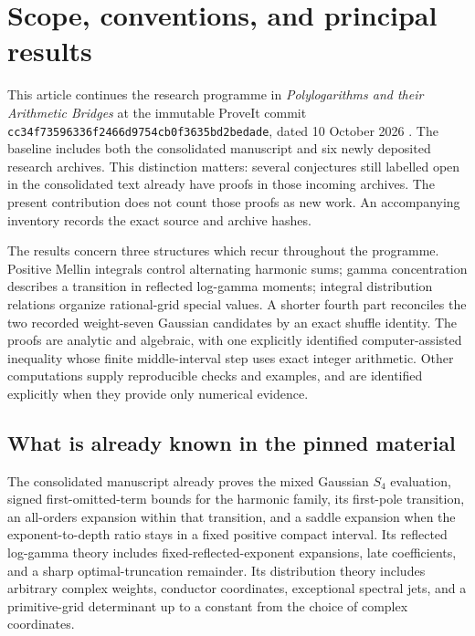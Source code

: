 \section{Scope, conventions, and principal results}
\label{cont:sec:introduction}

This article continues the research programme in \emph{Polylogarithms
and their Arithmetic Bridges} at the immutable ProveIt commit
\texttt{cc34f73596336f2466d9754cb0f3635bd2bedade}, dated
10 October 2026 \cite{cont:ProveIt}. The baseline includes both the
consolidated manuscript and six newly deposited research archives.
This distinction matters: several conjectures still labelled open in
the consolidated text already have proofs in those incoming archives.
The present contribution does not count those proofs as new work.
An accompanying inventory records the exact source and archive hashes.

The results concern three structures which recur throughout the
programme. Positive Mellin integrals control alternating harmonic sums;
gamma concentration describes a transition in reflected log-gamma
moments; integral distribution relations organize rational-grid special
values. A shorter fourth part reconciles the two recorded weight-seven
Gaussian candidates by an exact shuffle identity. The proofs are analytic
and algebraic, with one explicitly identified computer-assisted inequality
whose finite middle-interval step uses exact integer arithmetic. Other
computations supply reproducible checks and examples, and are identified
explicitly when they provide only numerical evidence.

\subsection{What is already known in the pinned material}

The consolidated manuscript already proves the mixed Gaussian
$S_4$ evaluation, signed first-omitted-term bounds for the harmonic
family, its first-pole transition, an all-orders expansion within that
transition, and a saddle expansion when the exponent-to-depth ratio
stays in a fixed positive compact interval. Its reflected log-gamma
theory includes fixed-reflected-exponent expansions, late coefficients,
and a sharp optimal-truncation remainder. Its distribution theory
includes arbitrary complex weights, conductor coordinates, exceptional
spectral jets, and a primitive-grid determinant up to a constant from
the choice of complex coordinates.

